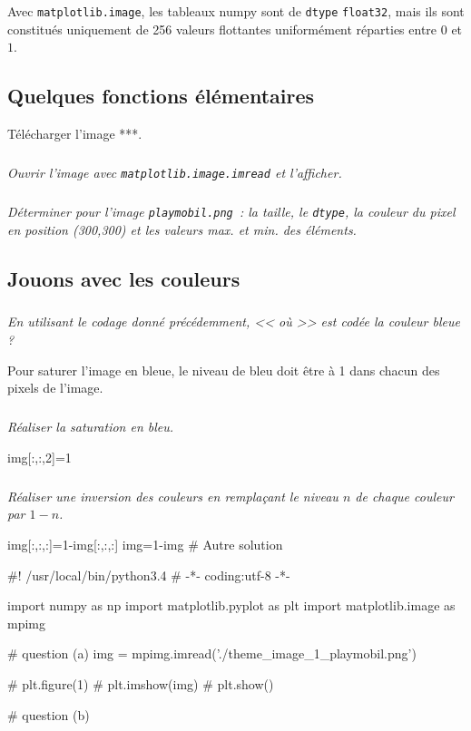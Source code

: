 \documentclass[10pt,fleqn]{article} %
\begin{document}
\begin{multicols}{2}
\begin{remark}
  Avec \texttt{matplotlib.image}, les tableaux numpy sont de
  \texttt{dtype} \texttt{float32}, mais ils sont constitués uniquement
  de 256 valeurs flottantes uniformément réparties entre $0$ et $1$.
\end{remark}


\subsection*{Quelques fonctions élémentaires}
Télécharger l'image ***.
\subparagraph{}\textit{Ouvrir l'image avec \texttt{matplotlib.image.imread} et l'afficher.}


\subparagraph{}\textit{Déterminer pour l'image \texttt{playmobil.png}~: la taille, le
  \texttt{dtype}, la couleur du  pixel en position (300,300) et les
  valeurs max. et min. des éléments.}




\subsection*{Jouons avec les couleurs}
\subparagraph{}\textit{En utilisant le codage donné précédemment, << où >> est codée la couleur bleue ?}

Pour saturer l'image en bleue, le niveau de bleu doit être à 1 dans chacun des pixels de l'image. 

\subparagraph{}\textit{Réaliser la saturation en bleu.}

\begin{python}
img[:,:,2]=1
\end{python}

\subparagraph{}\textit{Réaliser une inversion des couleurs en remplaçant le niveau $n$ de chaque couleur par $1-n$.}
\begin{python}
img[:,:,:]=1-img[:,:,:]
img=1-img # Autre solution
\end{python}


\ifprof
\begin{corrige}
\begin{python}
#! /usr/local/bin/python3.4
# -*- coding:utf-8 -*-
    
import numpy as np
import matplotlib.pyplot as plt
import matplotlib.image as mpimg

# question (a)
img = mpimg.imread('./theme_image_1_playmobil.png')  

# plt.figure(1)
# plt.imshow(img)
# plt.show()

# question (b)


\end{python}
\end{corrige}
\end{multicols}
\end{document}
